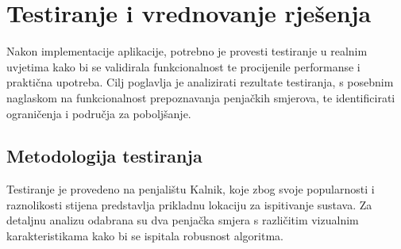 \chapter{Testiranje i vrednovanje rješenja}

Nakon implementacije aplikacije, potrebno je provesti testiranje u realnim uvjetima kako bi se validirala funkcionalnost te procijenile performanse i praktična upotreba. Cilj poglavlja je analizirati rezultate testiranja, s posebnim naglaskom na funkcionalnost prepoznavanja penjačkih smjerova, te identificirati ograničenja i područja za poboljšanje.

\section{Metodologija testiranja}

Testiranje je provedeno na penjalištu Kalnik, koje zbog svoje popularnosti i raznolikosti stijena predstavlja prikladnu lokaciju za ispitivanje sustava. Za detaljnu analizu odabrana su dva penjačka smjera s različitim vizualnim karakteristikama kako bi se ispitala robusnost algoritma. 

